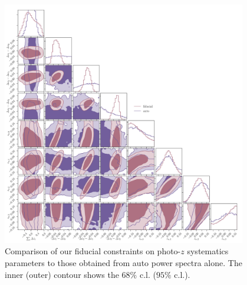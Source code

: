 \documentclass[a4paper,11pt]{article}
\begin{document}
      \begin{figure}
        \begin{center}
          \includegraphics[width=0.95\textwidth]{figures/contours-pz-syst_mPk=HOD_fix=alpha-fc-sigmaM_HOD=zevol_fit=pz-shifts+prior=0p2-pz-widths+prior=0p2_cosmo=const_cov=G+NG+SSC-LINBIAS_HOD-param=zfid_clfit=HOD-zevol_fit=auto+cross-vs-fit=auto.pdf}
          \caption{Comparison of our fiducial constraints on photo-$z$ systematics parameters to those obtained from auto power spectra alone. The inner (outer) contour shows the $68 \%$ c.l. ($95 \%$ c.l.).}
          \label{fig:constraints-pz-syst-auto+cross-vs-auto}
        \end{center}
      \end{figure}
\end{document}
